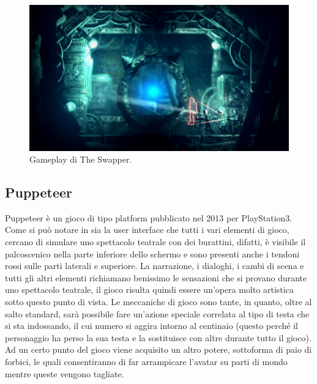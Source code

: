\begin{figure}[h]
\centerline{\includegraphics[scale=0.3]{images/statoarte/tsgameplay.png}}
\caption{Gameplay di The Swapper.}
\label{fig:pgameplay}
\end{figure}


\subsection{Puppeteer}
\label{sec:stato_arte_puppeteer}

Puppeteer è un gioco di tipo platform pubblicato nel 2013 per PlayStation3. Come si può notare in \myfig{\ref{fig:pgameplay}} sia la user interface che tutti i vari elementi di gioco, cercano di simulare uno spettacolo teatrale con dei burattini, difatti, è visibile il palcoscenico nella parte inferiore dello schermo e sono presenti anche i tendoni rossi sulle parti laterali e superiore. La narrazione, i dialoghi, i cambi di scena e tutti gli altri elementi richiamano benissimo le sensazioni che si provano durante uno spettacolo teatrale, il gioco risulta quindi essere un'opera molto artistica sotto questo punto di vista. Le meccaniche di gioco sono tante, in quanto, oltre al salto standard, sarà possibile fare un'azione speciale correlata al tipo di testa che si sta indossando, il cui numero si aggira intorno al centinaio (questo perché il personaggio ha perso la sua testa e la sostituisce con altre durante tutto il gioco). Ad un certo punto del gioco viene acquisito un altro potere, sottoforma di paio di forbici, le quali consentiranno di far arrampicare l'avatar su parti di mondo mentre queste vengono tagliate.

